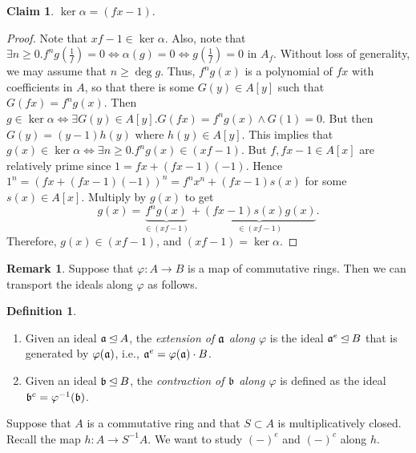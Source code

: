 \documentclass[10pt,letterpaper,cm]{nupset}
\theoremstyle{definition}
\newtheorem*{definition}{Definition}
\newtheorem{claim}{Claim}
\newtheorem{remark}{Remark}
\newcommand{\1}{\mathbf{1}}
\newcommand{\0}{\vec 0}
\begin{document}
\begin{claim}
$\ker{\alpha} = (fx-1)$.
\end{claim}
\begin{proof}
Note that $xf-1\in \ker{\alpha}$. Also, note that  $ \exists n\geq 0. f^ng(\frac{1}{f})=0 \iff  \alpha(g) = 0 \iff  g(\frac{1}{f}) = 0$ in $A_f$. Without loss of generality, we may assume that $n\geq \deg{g}$. Thus, $f^ng(x)$ is a polynomial of $fx$ with coefficients in $A$, so that there is some $G(y) \in A[y]$ such that $G(fx) = f^ng(x)$. Then $g\in \ker{\alpha} \iff \exists G(y) \in A[y]. G(fx) = f^ng(x) \land G(1) =0$. But then $G(y) = (y-1)h(y)$ where $h(y) \in A[y]$. This implies that $g(x) \in \ker{\alpha} \iff \exists n\geq 0 . f^ng(x) \in (xf -1)$. But $f, fx-1 \in A[x]$ are relatively prime since $1= fx + (fx-1)(-1)$.  Hence $1^n = (fx + (fx-1)(-1))^n = f^n x^n + (fx-1)s(x)$ for some $s(x) \in A[x]$. Multiply by $g(x)$ to get $$  g(x) = \underbrace{f^ng(x)}_{\in (xf-1)} + \underbrace{(fx -1)s(x)g(x)}_{\in (xf-1)}  .$$ Therefore, $g(x) \in (xf-1)$, and $(xf-1)=  \ker{\alpha}$. 
\end{proof}

\begin{remark}
Suppose that $\varphi : A \to B$ is a map of commutative rings. Then we can transport the ideals along $\varphi$ as follows. 
\begin{definition} $ $
\begin{enumerate}
\item
Given an ideal $\frak{a} \unlhd A$, the \textit{extension of $\frak{a}$ along $\varphi$} is the ideal $\frak{a}^e \unlhd B$ that is generated by $\varphi(\frak{a})$, i.e., $\frak{a}^e = \varphi(\frak{a}) \cdot B$.  
\item Given an ideal $\frak{b} \unlhd B$, the \textit{contraction of $\frak{b}$ along $\varphi$} is defined as the ideal $\frak{b}^c = \varphi^{-1}(\frak{b})$. 
\end{enumerate}
\end{definition}
Suppose that $A$ is a commutative ring and that $S\subset A$ is multiplicatively closed. Recall the map $h: A \to S^{-1}A$. We want to study $(-)^e$ and $(-)^c$ along $h$. 
\end{remark}
\end{document}
